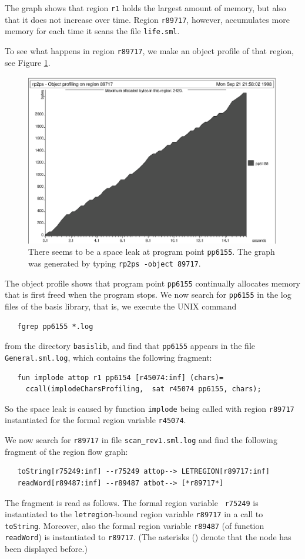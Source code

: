 \documentclass[12pt]{book}
\begin{document}
The graph shows that region \texttt{r1} holds the largest amount of memory,
but also that it does not increase over time. Region \texttt{r89717}, however,
accumulates more memory for each time it scans the file {\tt life.sml}.

To see what happens in region \texttt{r89717}, we make an object profile of
that region, see Figure \ref{scan_rev1_2.fig}.
\begin{figure}
\begin{center}
  \includegraphics{scan_rev1_2.ps}
\end{center}
\caption{There seems to be a space leak at program point
  \texttt{pp6155}. The graph was generated by typing \texttt{rp2ps
    -object 89717}.}
\label{scan_rev1_2.fig}
\end{figure}
The object profile shows that program point \texttt{pp6155}
continually allocates memory that is first freed when the program
stops. We now search for \texttt{pp6155} in the log files of the basis
library, that is, we execute the UNIX command
\begin{verbatim}
   fgrep pp6155 *.log
\end{verbatim}
from the directory {\tt basislib}, and find that {\tt pp6155}
appears in the file {\tt General.sml.log}, which contains the following
fragment:
\begin{verbatim}
   fun implode attop r1 pp6154 [r45074:inf] (chars)= 
     ccall(implodeCharsProfiling,  sat r45074 pp6155, chars);
\end{verbatim}
So the space leak is caused by function {\tt implode} being called
with region {\tt r89717} instantiated for the formal region variable
{\tt r45074}.

We now search for \texttt{r89717} in file \texttt{scan\_rev1.sml.log} and
find the following fragment of the region flow graph:
\begin{verbatim}
   toString[r75249:inf] --r75249 attop--> LETREGION[r89717:inf]
   readWord[r89487:inf] --r89487 atbot--> [*r89717*]
\end{verbatim}
The fragment is read as follows. The formal region variable {\tt
  r75249} is instantiated to the {\tt letregion}-bound region variable
{\tt r89717} in a call to {\tt toString}. Moreover, also the formal
region variable {\tt r89487} (of function {\tt readWord}) is
instantiated to {\tt r89717}. (The asterisks ({\tt *}) denote that the
node has been displayed before.)
\end{document}
